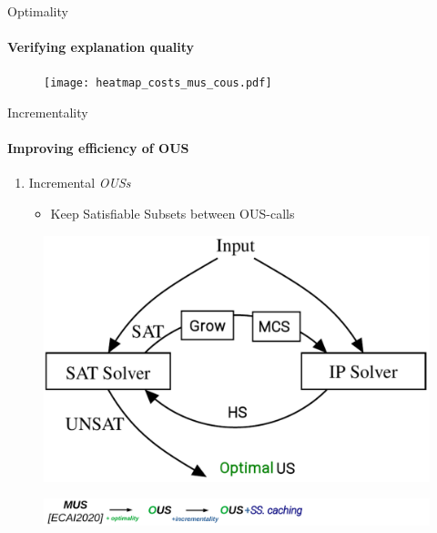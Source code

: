\documentclass{beamer}
\begin{document}
\begin{frame}{Optimality}
	\framesubtitle{Verifying explanation quality}
	\pause
			\begin{figure}
		\texttt{[image: heatmap\_costs\_mus\_cous.pdf]}
	\end{figure}
\end{frame}
	
	
	
	
		\begin{frame}{Incrementality}
			\framesubtitle{Improving efficiency of OUS}
		
		\begin{minipage}{0.59\textwidth}
			\begin{enumerate}
				\item {\color{vuborange} Incremental \emph{OUSs} }
				\begin{itemize}
					\item Keep Satisfiable Subsets between OUS-calls
				\end{itemize}	
			\end{enumerate}
		\end{minipage}
		\begin{minipage}{0.4\textwidth}
			\begin{figure}
				\includegraphics[width=\textwidth]{ihs.png}
			\end{figure}
		\end{minipage}
		\vfill
		\begin{figure}
			\includegraphics[width=\textwidth]{mus_to_ous_i.png}
		\end{figure}
	\end{frame}
	
\end{document}

